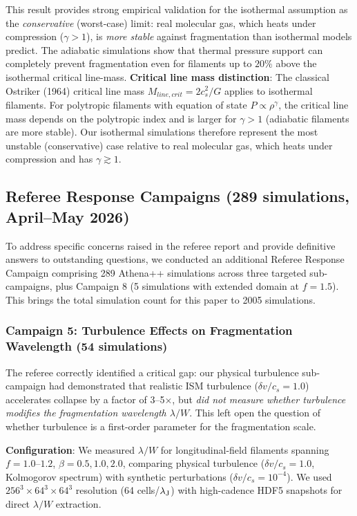 \documentclass[twoside,twocolumn]{mnras}
\begin{document}
This result provides strong empirical validation for the isothermal assumption as the {\it conservative} (worst-case) limit: real molecular gas, which heats under compression ($\gamma > 1$), is {\it more stable} against fragmentation than isothermal models predict. The adiabatic simulations show that thermal pressure support can completely prevent fragmentation even for filaments up to $20\%$ above the isothermal critical line-mass. \textbf{Critical line mass distinction}: The classical Ostriker (1964) critical line mass $M_{line,crit} = 2c_s^2/G$ applies to isothermal filaments. For polytropic filaments with equation of state $P \propto \rho^\gamma$, the critical line mass depends on the polytropic index and is larger for $\gamma > 1$ (adiabatic filaments are more stable). Our isothermal simulations therefore represent the most unstable (conservative) case relative to real molecular gas, which heats under compression and has $\gamma \gtrsim 1$.

\subsection{Referee Response Campaigns (289 simulations, April--May 2026)}
\label{sec:referee_response}

To address specific concerns raised in the referee report and provide definitive answers to outstanding questions, we conducted an additional Referee Response Campaign comprising 289 Athena++ simulations across three targeted sub-campaigns, plus Campaign 8 (5 simulations with extended domain at $f = 1.5$). This brings the total simulation count for this paper to 2005 simulations.

\subsubsection{Campaign 5: Turbulence Effects on Fragmentation Wavelength (54 simulations)}

The referee correctly identified a critical gap: our physical turbulence sub-campaign had demonstrated that realistic ISM turbulence ($\delta v/c_s = 1.0$) accelerates collapse by a factor of 3--5$\times$, but \textit{did not measure whether turbulence modifies the fragmentation wavelength $\lambda/W$}. This left open the question of whether turbulence is a first-order parameter for the fragmentation scale.

\textbf{Configuration}: We measured $\lambda/W$ for longitudinal-field filaments spanning $f = 1.0$--$1.2$, $\beta = 0.5, 1.0, 2.0$, comparing physical turbulence ($\delta v/c_s = 1.0$, Kolmogorov spectrum) with synthetic perturbations ($\delta v/c_s = 10^{-4}$). We used $256^3 \times 64^3 \times 64^3$ resolution (64 cells/$\lambda_{\rm J}$) with high-cadence HDF5 snapshots for direct $\lambda/W$ extraction.
\end{document}
